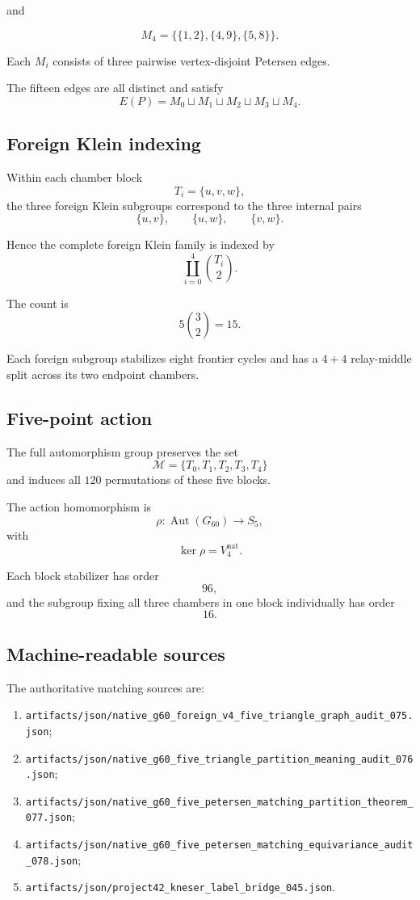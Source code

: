 and

\[
M_4
=
\bigl\{
\{1,2\},
\{4,9\},
\{5,8\}
\bigr\}.
\]

Each \(M_i\) consists of three pairwise vertex-disjoint Petersen edges.

The fifteen edges are all distinct and satisfy
\[
E(P)
=
M_0\sqcup M_1\sqcup M_2\sqcup M_3\sqcup M_4.
\]

\subsection{Foreign Klein indexing}

Within each chamber block
\[
T_i=\{u,v,w\},
\]
the three foreign Klein subgroups correspond to the three internal
pairs
\[
\{u,v\},
\qquad
\{u,w\},
\qquad
\{v,w\}.
\]

Hence the complete foreign Klein family is indexed by
\[
\coprod_{i=0}^{4}\binom{T_i}{2}.
\]

The count is
\[
5\binom32=15.
\]

Each foreign subgroup stabilizes eight frontier cycles and has a
\(4+4\) relay-middle split across its two endpoint chambers.

\subsection{Five-point action}

The full automorphism group preserves the set
\[
\mathcal M
=
\{T_0,T_1,T_2,T_3,T_4\}
\]
and induces all \(120\) permutations of these five blocks.

The action homomorphism is
\[
\rho:
\operatorname{Aut}(G_{60})
\longrightarrow
S_5,
\]
with
\[
\ker\rho=V_4^{\mathrm{nat}}.
\]

Each block stabilizer has order
\[
96,
\]
and the subgroup fixing all three chambers in one block individually
has order
\[
16.
\]

\subsection{Machine-readable sources}

The authoritative matching sources are:

\begin{enumerate}
    \item
    \texttt{artifacts/json/native\_g60\_foreign\_v4\_five\_triangle\_graph\_audit\_075.json};

    \item
    \texttt{artifacts/json/native\_g60\_five\_triangle\_partition\_meaning\_audit\_076.json};

    \item
    \texttt{artifacts/json/native\_g60\_five\_petersen\_matching\_partition\_theorem\_077.json};

    \item
    \texttt{artifacts/json/native\_g60\_five\_petersen\_matching\_equivariance\_audit\_078.json};

    \item
    \texttt{artifacts/json/project42\_kneser\_label\_bridge\_045.json}.
\end{enumerate}
